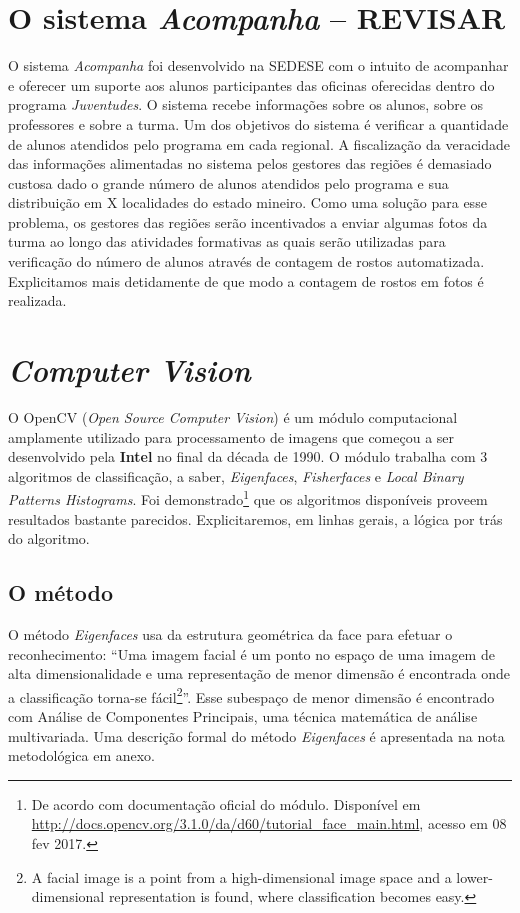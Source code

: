 \documentclass[a4paper, 12pt, openright, oneside, english, brazil, article]{abntex2}
\begin{document}
	\section*{O sistema \textit{Acompanha} -- REVISAR}
	
	O sistema \textit{Acompanha} foi desenvolvido na SEDESE com o intuito de acompanhar e oferecer um suporte aos alunos participantes das oficinas oferecidas dentro do programa \textit{Juventudes}. O sistema recebe informações sobre os alunos, sobre os professores e sobre a turma. Um dos objetivos do sistema é verificar a quantidade de alunos atendidos pelo programa em cada regional. A fiscalização da veracidade das informações alimentadas no sistema pelos gestores das regiões é demasiado custosa dado o grande número de alunos atendidos pelo programa e sua distribuição em X localidades do estado mineiro. Como uma solução para esse problema, os gestores das regiões serão incentivados a enviar algumas fotos da turma ao longo das atividades formativas as quais serão utilizadas para verificação do número de alunos através de contagem de rostos automatizada. Explicitamos mais detidamente de que modo a contagem de rostos em fotos é realizada.
	
	\section*{\textit{Computer Vision}}
	
	O OpenCV (\textit{Open Source Computer Vision}) é um módulo computacional amplamente utilizado para processamento de imagens que começou a ser desenvolvido pela \textbf{Intel} no final da década de 1990. O módulo trabalha com 3 algoritmos de classificação, a saber, \textit{Eigenfaces}, \textit{Fisherfaces} e \textit{Local Binary Patterns Histograms}. Foi demonstrado\footnote{De acordo com documentação oficial do módulo. Disponível em \url{http://docs.opencv.org/3.1.0/da/d60/tutorial_face_main.html}, acesso em 08 fev 2017.} que os algoritmos disponíveis proveem resultados bastante parecidos. Explicitaremos, em linhas gerais, a lógica por trás do algoritmo.
	
	\subsection*{O método}
	
	O método \textit{Eigenfaces} usa da estrutura geométrica da face para efetuar o reconhecimento: ``Uma imagem facial é um ponto no espaço de uma imagem de alta dimensionalidade e uma representação de menor dimensão é encontrada onde a classificação torna-se fácil\footnote{A facial image is a point from a high-dimensional image space and a lower-dimensional representation is found, where classification becomes easy.}''. Esse subespaço de menor dimensão é encontrado com Análise de Componentes Principais, uma técnica matemática de análise multivariada. Uma descrição formal do método \textit{Eigenfaces} é apresentada na nota metodológica em anexo.
	
\end{document}
